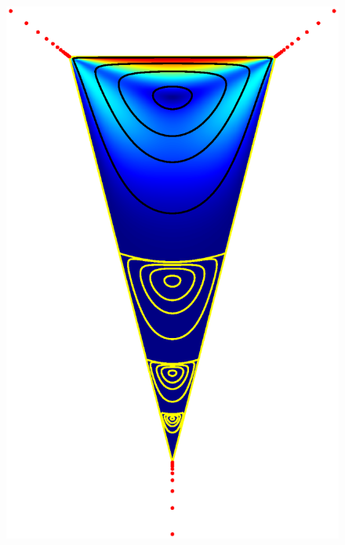 \begin{figure}[H]
	
	\centering
	\begin{minipage}{0.45\linewidth}
		\centering
		\includegraphics[width=\linewidth]{Figures/wedge}
	\end{minipage}
	\hfill
	\begin{minipage}{0.45\linewidth}
		\centering

\end{minipage}
\end{figure}
